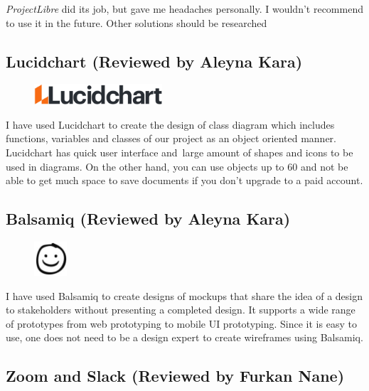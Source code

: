 \documentclass[]{article}
\begin{document}
\emph{ProjectLibre} did its job, but gave me headaches personally. I
wouldn't recommend to use it in the future. Other solutions should be
researched

\hypertarget{lucidchart-reviewed-by-aleyna-kara}{%
    \subsection{Lucidchart (Reviewed by Aleyna
        Kara)}\label{lucidchart-reviewed-by-aleyna-kara}}

\begin{figure}
    \centering
    \includegraphics[height=0.3in]{./images/4.jpg}
\end{figure}

I have used Lucidchart to create the
design of class diagram which includes functions, variables and classes
of our project as an object oriented manner. Lucidchart has quick user
interface and~large amount of shapes and icons to be used in diagrams.
On the other hand, you can use objects up to 60 and not be able to get
much space to save documents if you don't upgrade to a paid account.

\hypertarget{balsamiq-reviewed-by-aleyna-kara}{%
    \subsection{Balsamiq (Reviewed by Aleyna
        Kara)}\label{balsamiq-reviewed-by-aleyna-kara}}

\begin{figure}
    \centering
    \includegraphics[height=0.5in]{./images/5.jpg}
\end{figure}

I have used Balsamiq to create designs of mockups that share the idea of
a design to stakeholders without presenting a completed design. It
supports a wide range of prototypes from web prototyping to mobile UI
prototyping. Since it is easy to use, one does not need to be a design
expert to create wireframes using Balsamiq.

\hypertarget{zoom-and-slack-reviewed-by-furkan-nane}{%
    \subsection{Zoom and Slack (Reviewed by Furkan
        Nane)}\label{zoom-and-slack-reviewed-by-furkan-nane}}
\end{document}
